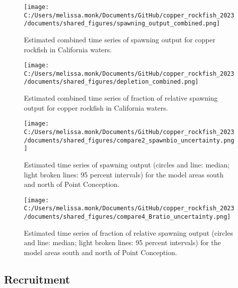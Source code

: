 \documentclass[11pt,
  letterpaper,
]{article}
\begin{document}
\begin{figure}
{\centering
\texttt{[image: C:/Users/melissa.monk/Documents/GitHub/copper\_rockfish\_2023/documents/shared\_figures/spawning\_output\_combined.png]}
}
\caption{Estimated combined time series of spawning output for copper rockfish in California waters.\label{fig:es-sb-all}}
\end{figure}

\begin{figure}
{\centering
\texttt{[image: C:/Users/melissa.monk/Documents/GitHub/copper\_rockfish\_2023/documents/shared\_figures/depletion\_combined.png]}
}
\caption{Estimated combined time series of fraction of relative spawning output for copper rockfish in California waters.\label{fig:es-depl-all}}
\end{figure}

\begin{figure}
{\centering
\texttt{[image: C:/Users/melissa.monk/Documents/GitHub/copper\_rockfish\_2023/documents/shared\_figures/compare2\_spawnbio\_uncertainty.png]}
}
\caption{Estimated time series of spawning output (circles and line: median; light broken lines: 95 percent intervals) for the model areas south and north of Point Conception.\label{fig:es-sb}}
\end{figure}

\begin{figure}
{\centering
\texttt{[image: C:/Users/melissa.monk/Documents/GitHub/copper\_rockfish\_2023/documents/shared\_figures/compare4\_Bratio\_uncertainty.png]}
}
\caption{Estimated time series of fraction of relative spawning output (circles and line: median; light broken lines: 95 percent intervals) for the model areas south and north of Point Conception.\label{fig:es-depl}}
\end{figure}

\pagebreak

\subsection*{Recruitment}\label{recruitment}
\end{document}
